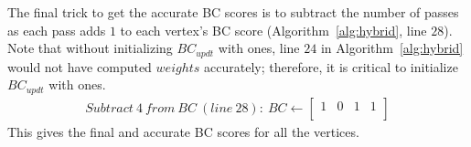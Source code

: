 %
The final trick to get the accurate BC scores is to subtract the number of
passes as each pass adds $1$ to each vertex's BC score
(Algorithm~\ref{alg:hybrid}, line $28$).
%
Note that without initializing $BC_{updt}$ with ones, line $24$ in
Algorithm~\ref{alg:hybrid} would not have computed $weights$ accurately;
therefore, it is critical to initialize $BC_{updt}$ with ones.
%
\begin{align*}
Subtract\ 4\ from\ BC\ (line\ 28):\ 
BC\leftarrow{}\left[\begin{array}{cccc}1 & 0 & 1 & 1 \\\end{array} \right]
\end{align*}
%
This gives the final and accurate BC scores for all the vertices.
%

%
%
